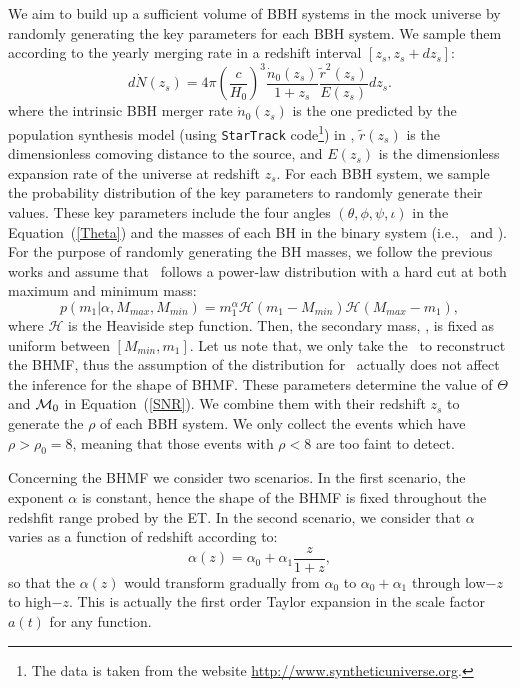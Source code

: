 \documentclass[twocolumn]{aastex62}
\newcommand{\kai}[1]{\textcolor{red}{[{\bf Kai}: #1]}}
\begin{document}
We aim to build up a sufficient volume of BBH systems in the mock universe by randomly generating the key parameters for each BBH system. We sample them according to the yearly merging rate in a redshift interval  $[z_{s}, z_{s}+dz_{s}]$:
 \begin{equation}
 d\dot{N} (z_s)=4\pi\left(\frac{c}{H_{0}}\right)^3\frac{\dot{n}_{0}(z_{s})}{1+z_{s}}\frac{\tilde{r}^2(z_{s})}{E(z_{s})}dz_{s}. 
 \end{equation}
where the intrinsic BBH merger rate $\dot{n}_{0}(z_{s})$ is the one predicted by the population synthesis model (using {\tt StarTrack} code\footnote{The data is taken from the website \url{http://www.syntheticuniverse.org}.}) in \citet{Dominik13}, $\tilde{r}(z_{s})$ is the dimensionless comoving distance to the source, and $E (z_s)$ is
the dimensionless expansion rate of the universe at redshift $z_s$. 
For each BBH system, we sample the probability distribution of the key parameters to randomly generate their values. These key parameters include the four angles $(\theta, \phi, \psi, \iota)$ in the Equation~(\ref{Theta})  and the masses of each BH in the binary system (i.e., \mone\ and \mtwo).
For the purpose of randomly generating the BH masses, we follow the previous works \citep{Kovetz2017PhRvD, Abbott2018b, Fishbach2018} and assume that \mone\ follows a power-law distribution with a hard cut at both maximum and minimum mass:
 \begin{equation} \label{equ_powlaw}
p(m_1|\alpha, M_{max}, M_{min}) = m_1^{\alpha} \mathcal{H}(m_1-M_{min}) \mathcal{H}(M_{max}-m_1),
 \end{equation}
where $\mathcal{H}$ is the Heaviside step function. Then, the secondary mass, \mtwo, is fixed as uniform between $[M_{min}, m_1]$. Let us note that, we only take the \mone\ to reconstruct the BHMF, thus the assumption of the distribution for \mtwo\ actually does not affect the inference for the shape of BHMF. These parameters determine the value of $\Theta$ and ${\cal M}_0$ in Equation~(\ref{SNR}). We combine them with their redshift $z_s$ to generate the $\rho$ of each BBH system. We only collect the events which have $\rho > \rho_0 = 8$, meaning that those events with $\rho < 8$ are too faint to detect. 

Concerning the BHMF we consider two scenarios. In the first scenario, the exponent $\alpha$ is constant, hence the shape of the BHMF is fixed throughout the redshfit range probed by the ET. In the second scenario, we consider that $\alpha$ varies as a function of redshift according to:
 \begin{equation} \label{equ_alphaz}
\alpha(z) = \alpha_0 + \alpha_1\frac{z}{1+z} , 
 \end{equation}
so that the $\alpha(z)$ would transform gradually from $\alpha_0$ to $\alpha_0+\alpha_1$ through low$-z$ to high$-z$. This is actually the first order Taylor expansion in the scale factor $a(t)$ for any function.
\end{document}
